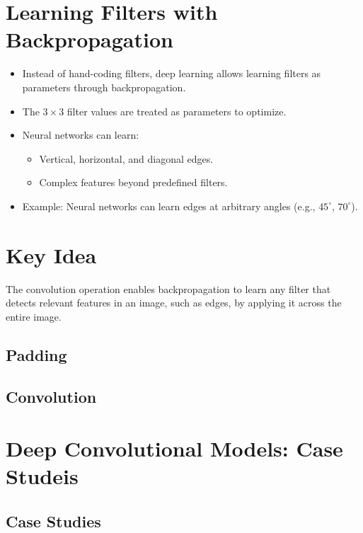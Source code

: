 \documentclass[letterpaper,12pt,notitlepage,twoside]{report}
\begin{document}
\section{Learning Filters with Backpropagation}
\begin{itemize}
    \item Instead of hand-coding filters, deep learning allows learning filters as parameters through backpropagation.
    \item The $3 \times 3$ filter values are treated as parameters to optimize.
    \item Neural networks can learn:
    \begin{itemize}
        \item Vertical, horizontal, and diagonal edges.
        \item Complex features beyond predefined filters.
    \end{itemize}
    \item Example: Neural networks can learn edges at arbitrary angles (e.g., $45^\circ$, $70^\circ$).
\end{itemize}

\section{Key Idea}
The convolution operation enables backpropagation to learn any filter that detects relevant features in an image, such as edges, by applying it across the entire image.

\subsection{Padding}
\subsection{Convolution}


\section{Deep Convolutional Models: Case Studeis}

\subsection{Case Studies}
\end{document}
